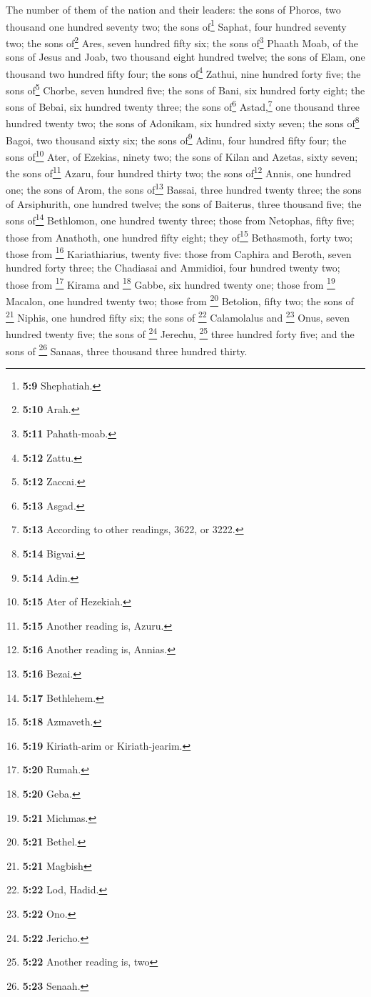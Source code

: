  The number of them of the nation and their leaders: the
sons of Phoros, two thousand one hundred seventy two; the sons
of\footnote{\textbf{5:9} Shephatiah.} Saphat, four hundred seventy two;
 the sons of\footnote{\textbf{5:10} Arah.} Ares, seven
hundred fifty six;  the sons of\footnote{\textbf{5:11}
  Pahath-moab.} Phaath Moab, of the sons of Jesus and Joab, two thousand
eight hundred twelve;  the sons of Elam, one thousand two
hundred fifty four; the sons of\footnote{\textbf{5:12} Zattu.} Zathui,
nine hundred forty five; the sons of\footnote{\textbf{5:12} Zaccai.}
Chorbe, seven hundred five; the sons of Bani, six hundred forty eight;
 the sons of Bebai, six hundred twenty three; the sons
of\footnote{\textbf{5:13} Asgad.} Astad,\footnote{\textbf{5:13}
  According to other readings, 3622, or 3222.} one thousand three
hundred twenty two;  the sons of Adonikam, six hundred
sixty seven; the sons of\footnote{\textbf{5:14} Bigvai.} Bagoi, two
thousand sixty six; the sons of\footnote{\textbf{5:14} Adin.} Adinu,
four hundred fifty four;  the sons of\footnote{\textbf{5:15}
  Ater of Hezekiah.} Ater, of Ezekias, ninety two; the sons of Kilan and
Azetas, sixty seven; the sons of\footnote{\textbf{5:15} Another reading
  is, Azuru.} Azaru, four hundred thirty two;  the sons
of\footnote{\textbf{5:16} Another reading is, Annias.} Annis, one
hundred one; the sons of Arom, the sons of\footnote{\textbf{5:16} Bezai.}
Bassai, three hundred twenty three; the sons of Arsiphurith, one hundred
twelve;  the sons of Baiterus, three thousand five; the
sons of\footnote{\textbf{5:17} Bethlehem.} Bethlomon, one hundred twenty
three;  those from Netophas, fifty five; those from
Anathoth, one hundred fifty eight; they of\footnote{\textbf{5:18}
  Azmaveth.} Bethasmoth, forty two;  those from
\footnote{\textbf{5:19} Kiriath-arim or Kiriath-jearim.} Kariathiarius,
twenty five: those from Caphira and Beroth, seven hundred forty three;
 the Chadiasai and Ammidioi, four hundred twenty two;
those from \footnote{\textbf{5:20} Rumah.} Kirama and \footnote{\textbf{5:20}
  Geba.} Gabbe, six hundred twenty one;  those from
\footnote{\textbf{5:21} Michmas.} Macalon, one hundred twenty two; those
from \footnote{\textbf{5:21} Bethel.} Betolion, fifty two; the sons of
\footnote{\textbf{5:21} Magbish} Niphis, one hundred fifty six;
 the sons of \footnote{\textbf{5:22} Lod, Hadid.}
Calamolalus and \footnote{\textbf{5:22} Ono.} Onus, seven hundred twenty
five; the sons of \footnote{\textbf{5:22} Jericho.} Jerechu, \footnote{\textbf{5:22}
  Another reading is, two} three hundred forty five;  and
the sons of \footnote{\textbf{5:23} Senaah.} Sanaas, three thousand
three hundred thirty.

